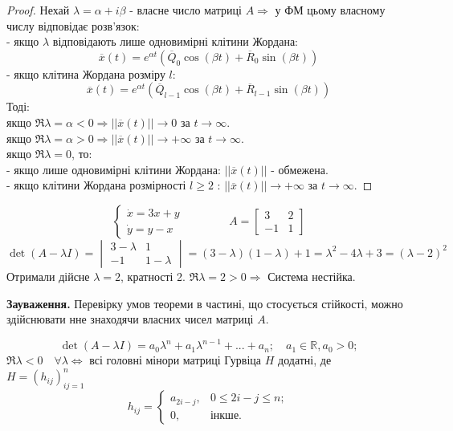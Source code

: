 \begin{proof}
  Нехай $ \lambda = \alpha + i\beta$ - власне число матриці $A \Rightarrow $ у ФМ цьому власному числу відповідає розв'язок: \\
  - якщо $ \lambda$ відповідають лише одновимірні клітини Жордана:
  $$
  \overline{x} (t) = e^{\alpha t} ( \overline{Q} _0 \cos{(\beta t)} + \overline{R}_0 \sin{(\beta t)} )
 $$
 - якщо клітина Жордана розміру $l$:
 $$
 \overline{x} (t) = e^{\alpha t} ( \overline{Q} _{l-1} \cos{(\beta t)} + \overline{R}_{l-1} \sin{(\beta t)} )
 $$
 Тоді:\\
якщо $ \Re \lambda = \alpha < 0  \Rightarrow || \overline{x} (t)|| \to 0 $ за $t \to \infty$.\\
якщо $ \Re \lambda = \alpha >0 \Rightarrow || \overline{x} (t)|| \to + \infty $ за $t \to \infty$.\\
якщо $ \Re \lambda = 0 $, то:\\
\hspace*{1cm} - якщо лише одновимірні клітини Жордана: $||\overline{x}(t) ||$ - обмежена.\\
\hspace*{1cm} - якщо клітини Жордана розмірності $l \geq 2$ : $ || \overline{x} (t)|| \to + \infty $ за $t \to \infty$.
\end{proof}
\begin{example}
    $$\begin{cases}
        \dot{x} = 3x + y \\
        \dot{y} = y-x
    \end{cases} \qquad \qquad A = \begin{bmatrix}
     3 & 2 \\ -1 & 1
    \end{bmatrix}
    $$
    $$
    \det \left( A - \lambda I  \right) = \begin{vmatrix}
      3 - \lambda & 1 \\
      -1 & 1- \lambda
    \end{vmatrix}  = (3 - \lambda) (1- \lambda) + 1 = \lambda^2 - 4 \lambda + 3 = (\lambda-2 )^2
    $$
    Отримали дійсне $\lambda=2$, кратності 2. $ \Re \lambda = 2 > 0 \Rightarrow $ Система нестійка.
\end{example}
\textbf{Зауваження.} Перевірку умов теореми в частині, що стосується стійкості, можно здійснювати нне знаходячи власних чисел матриці $A$.

\begin{boxteo}
$$
\det \left( A - \lambda I \right) = a_0 \lambda^n + a_1 \lambda^{n-1} + ... + a_n ; \quad a_1 \in \mathbb{R}, a_0 > 0;
$$
$
\Re \lambda < 0 \quad \forall \lambda \Leftrightarrow
$ всі головні мінори матриці Гурвіца $H$ додатні, де $ H =  \left( h_{ij} \right)^n_{ij=1} $
$$
h_{ij} = \begin{cases}
    a_{2i-j}, & 0 \leq 2i - j \leq  n;\\
    0 , & \text{інкше.}
\end{cases}
$$
\end{boxteo}
